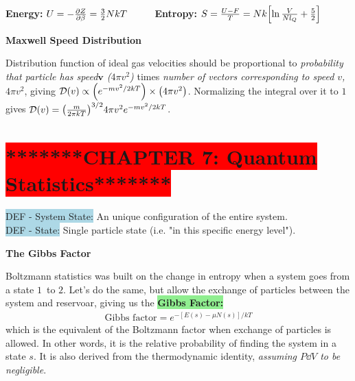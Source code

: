 \documentclass[8pt, a4paper]{extarticle}
\renewcommand{\exp}{e^}
\renewcommand{\b}{\boldsymbol}
\renewcommand{\exp}{e^}
\newcommand{\grr}{\colorbox{lightgreen}}
\newcommand{\bll}{\colorbox{lightblue}}
\newcommand{\rdd}{\colorbox{lightred}}
\begin{document}
\begin{twocolumn}
\begin{framed}
\textbf{Energy:} $U = -\pdv{Z}{\beta} = \frac{3}{2}NkT$ \ \ \ \ \ 
\textbf{Entropy:} $S = \frac{U - F}{T} = Nk\qty[\ln{\frac{V}{Nl_Q}} + \frac{5}{2}]$
\end{framed}


\rdd{\textbf{Maxwell Speed Distribution}}
\begin{framed}
Distribution function of ideal gas velocities should be proportional to \textit{probability that particle has speed$\b v$ ($4\pi v^2$)} times \textit{number of vectors corresponding to speed $v$, $4\pi v^2$}, giving $\mathcal{D}(v) \propto \qty(\exp{-mv^2/2kT})\times \qty(4\pi v^2)$. Normalizing the integral over it to $1$ gives
$\mathcal{D}(v) = \qty(\frac{m}{2\pi kT})^{3/2}4\pi v^2 \exp{-mv^2/2kT}$.
\end{framed}



\section*{\colorbox{red}{*******CHAPTER 7: Quantum Statistics*******}}
\bll{DEF - System State:} An unique configuration of the entire system. \\
\bll{DEF - State:} Single particle state (i.e. "in this specific energy level").



\rdd{\textbf{The Gibbs Factor}}
\begin{framed}
Boltzmann statistics was built on the change in entropy when a system goes from a state $1$ to $2$. Let's do the same, but allow the exchange of particles between the system and reservoar, giving us the \grr{\textbf{Gibbs Factor:}}
\vspace{-.2cm}\begin{align}
    \text{Gibbs factor}= \exp{-[E(s)-\mu N(s)]/kT}
\end{align}
which is the equivalent of the Boltzmann factor when exchange of particles is allowed. In other words, it is the relative probability of finding the system in a state $s$. It is also derived from the thermodynamic identity, \textit{assuming $P\dd{V}$ to be negligible}.


\end{framed}
\end{twocolumn}
\end{document}
